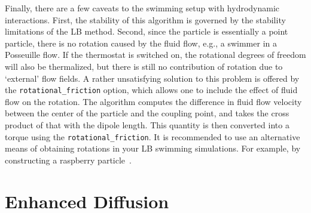 \documentclass[aip,jcp,reprint,a4paper,onecolumn,amsmath]{revtex4-1}
\newcommand\codees{\lstinline[language=python]}
\begin{document}
Finally, there are a few caveats to the swimming setup with hydrodynamic interactions. First, the stability of this algorithm is governed by the stability limitations of the LB method. Second, since the particle is essentially a point particle, there is no rotation caused by the fluid flow, e.g., a swimmer in a Posseuille flow. If the thermostat is switched on, the rotational degrees of freedom will also be thermalized, but there is still no contribution of rotation due to `external' flow fields. A rather unsatisfying solution to this problem is offered by the \codees{rotational_friction} option, which allows one to include the effect of fluid flow on the rotation. The algorithm computes the difference in fluid flow velocity between the center of the particle and the coupling point, and takes the cross product of that with the dipole length. This quantity is then converted into a torque using the \codees{rotational_friction}. It is recommended to use an alternative means of obtaining rotations in your LB swimming simulations. For example, by constructing a raspberry particle~\cite{lobaskin04,chatterji05,fischer15,degraaf15}.

\section{\label{sec:enhanced}Enhanced Diffusion}
\end{document}
